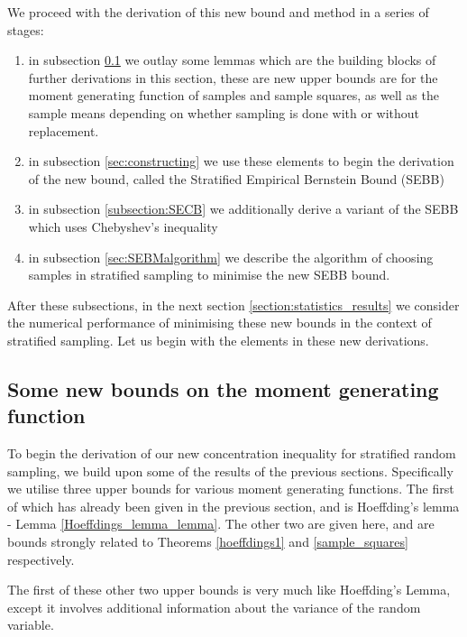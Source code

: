 We proceed with the derivation of this new bound and method in a series of stages:
\begin{enumerate}
\item	in subsection \ref{subsection:new_bounds} we outlay some lemmas which are the building blocks of further derivations in this section, these are new upper bounds are for the moment generating function of samples and sample squares, as well as the sample means depending on whether sampling is done with or without replacement.
\item	in subsection \ref{sec:constructing} we use these elements to begin the derivation of the new bound, called the Stratified Empirical Bernstein Bound (SEBB)
\item	in subsection \ref{subsection:SECB} we additionally derive a variant of the SEBB which uses Chebyshev's inequality
\item	in subsection \ref{sec:SEBMalgorithm} we describe the algorithm of choosing samples in stratified sampling to minimise the new SEBB bound.
\end{enumerate}

After these subsections, in the next section \ref{section:statistics_results} we consider the numerical performance of minimising these new bounds in the context of stratified sampling.
Let us begin with the elements in these new derivations.



\subsection{Some new bounds on the moment generating function}\label{subsection:new_bounds}

To begin the derivation of our new concentration inequality for stratified random sampling, we build upon some of the results of the previous sections.
Specifically we utilise three upper bounds for various moment generating functions.
The first of which has already been given in the previous section, and is Hoeffding's lemma - Lemma \ref{Hoeffdings_lemma_lemma}.
The other two are given here, and are bounds strongly related to Theorems \ref{hoeffdings1} and \ref{sample_squares} respectively.

The first of these other two upper bounds is very much like Hoeffding's Lemma, except it involves additional information about the variance of the random variable.

